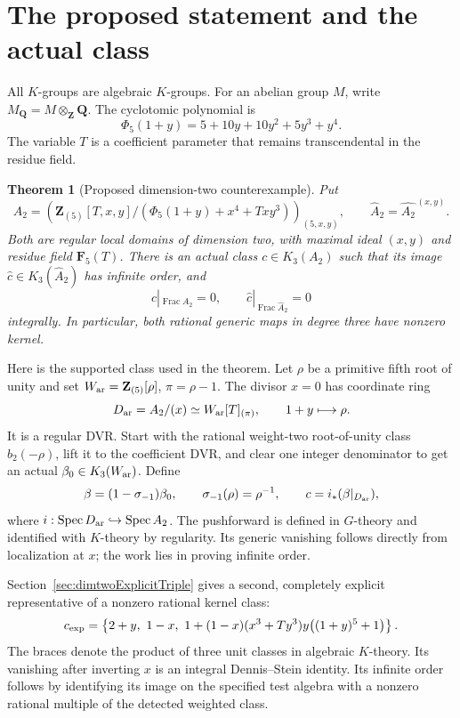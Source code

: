 \documentclass[11pt,a4paper]{article}
\newtheorem{theorem}{Theorem}[section]
\theoremstyle{remark}
\newcommand{\Q}{\mathbf Q}
\newcommand{\Z}{\mathbf Z}
\newcommand{\F}{\mathbf F}
\newcommand{\Spec}{\operatorname{Spec}}
\newcommand{\Frac}{\operatorname{Frac}}
\begin{document}
\section{The proposed statement and the actual class}
\label{sec:dimtwoStatement}

All $K$-groups are algebraic $K$-groups.  For an abelian group $M$,
write $M_{\Q}=M\otimes_{\Z}\Q$.  The cyclotomic polynomial is
\[
 \Phi_5(1+y)=5+10y+10y^2+5y^3+y^4.
\]
The variable $T$ is a coefficient parameter that remains
transcendental in the residue field.

\begin{theorem}[Proposed dimension-two counterexample]
\label{thm:dimensiontwoMain}
Put
\[
 A_2=\left(\Z_{(5)}[T,x,y]/
   (\Phi_5(1+y)+x^4+Txy^3)\right)_{(5,x,y)},
 \qquad \widehat A_2=\widehat{A_2}^{\,(x,y)}.
\]
Both are regular local domains of dimension two, with maximal
ideal $(x,y)$ and residue field $\F_5(T)$.  There is an actual
class $c\in K_3(A_2)$ such that its image
$\widehat c\in K_3(\widehat A_2)$ has infinite order, and
\[
 c|_{\Frac A_2}=0,\qquad
 \widehat c|_{\Frac\widehat A_2}=0
\]
integrally.  In particular, both rational generic maps in degree
three have nonzero kernel.
\end{theorem}

Here is the supported class used in the theorem.  Let $\rho$ be
a primitive fifth root of unity and set
$W_{\rm ar}=\Z_{(5)}[\rho]$, $\pi=\rho-1$.
The divisor $x=0$ has coordinate ring
\[
 D_{\rm ar}=A_2/(x)\simeq W_{\rm ar}[T]_{(\pi)},
 \qquad 1+y\longmapsto\rho.
\]
It is a regular DVR.  Start with the rational weight-two
root-of-unity class $b_2(-\rho)$, lift it to the coefficient DVR,
and clear one integer denominator to get an actual
$\beta_0\in K_3(W_{\rm ar})$.  Define
\[
 \beta=(1-\sigma_{-1})\beta_0,
 \qquad \sigma_{-1}(\rho)=\rho^{-1},
 \qquad c=i_*(\beta|_{D_{\rm ar}}),
\]
where $i:\Spec D_{\rm ar}\hookrightarrow\Spec A_2$.
The pushforward is defined in $G$-theory and identified with
$K$-theory by regularity.  Its generic vanishing follows directly
from localization at $x$; the work lies in proving infinite order.

Section~\ref{sec:dimtwoExplicitTriple} gives a second, completely
explicit representative of a nonzero rational kernel class:
\[
 c_{\rm exp}=\left\{2+y,\ 1-x,\
 1+(1-x)(x^3+Ty^3)y\bigl((1+y)^5+1\bigr)\right\}.
\]
The braces denote the product of three unit classes in algebraic
$K$-theory. Its vanishing after inverting $x$ is an integral
Dennis--Stein identity. Its infinite order follows by identifying
its image on the specified test algebra with a nonzero rational
multiple of the detected weighted class.
\end{document}

